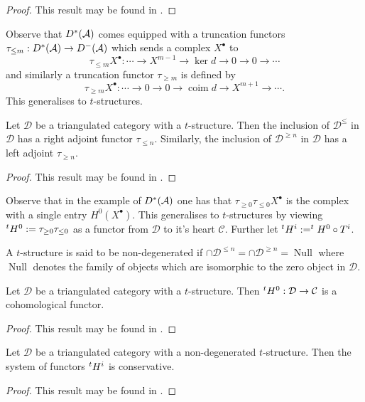 \begin{proof}
  This result may be found in \cite[Chapter 5]{dimca2004sheaves}.
\end{proof}
Observe that $D^*(\AA)$ comes equipped with a truncation functors
$\tau_{\leq m}:D^*(\AA)\to D^-(\AA)$ which sends a complex $X^\bullet$ to
$$\tau_{\leq m}X^\bullet : \cdots \to X^{m-1} \to \ker d \to 0 \to 0 \to \cdots$$
and similarly a truncation functor $\tau_{\geq m}$ is defined by
$$\tau_{\geq m}X^\bullet: \cdots \to 0 \to 0 \to \operatorname{coim} d \to X^{m+1}\to \cdots.$$
This generalises to $t$-structures.
\begin{proposition}
 Let $\mathcal{D}$ be a triangulated category with a $t$-structure.
 Then the inclusion of $\mathcal{D}^{\leq}$ in $\mathcal{D}$ has a right adjoint functor $\tau_{\leq n}$.
 Similarly, the inclusion of $\mathcal{D}^{\geq n}$ in $\mathcal{D}$ has a left adjoint $\tau_{\geq n}$.
\end{proposition}
\begin{proof}
  This result may be found in \cite[Chapter 5]{dimca2004sheaves}.
\end{proof}
Observe that in the example of $D^*(\AA)$ one has that $\tau_{\geq 0} \tau_{\leq 0} X^\bullet$ is the complex with a single entry $H^0(X^\bullet)$.
This generalises to $t$-structures by viewing $\tH^0:= \tau_{\geq 0}\tau_{\leq 0}$ as a functor from $\mathcal{D}$ to it's heart $\mathcal{C}$.
Further let $\tH^i:= \tH^0 \circ T^i$.
\begin{definition}
 A $t$-structure is said to be non-degenerated if $\cap \mathcal{D}^{\leq n} = \cap \mathcal{D}^{\geq n}= \operatorname{Null}$ where $\operatorname{Null}$ denotes the family of objects which are isomorphic to the zero object in $\mathcal{D}$.
\end{definition}
\begin{proposition}
 Let $\mathcal{D}$ be a triangulated category with a $t$-structure. Then $\tH^0:\mathcal{D}\to \mathcal{C}$ is a cohomological functor.
\end{proposition}
\begin{proof}
  This result may be found in \cite[Chapter 5]{dimca2004sheaves}.
\end{proof}
\begin{proposition}
 Let $\mathcal{D}$ be a triangulated category with a non-degenerated $t$-structure. Then the system of functors $\tH^i$ is conservative.
\end{proposition}
\begin{proof}
  This result may be found in \cite[Chapter 5]{dimca2004sheaves}.
\end{proof}
